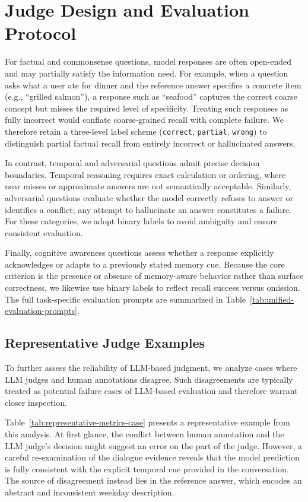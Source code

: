 \documentclass[11pt]{article}
\begin{document}
\section{Judge Design and Evaluation Protocol}
\label{app:judge_details}

For factual and commonsense questions, model responses are often
open-ended and may partially satisfy the information need.
For example, when a question asks what a user ate for dinner and the
reference answer specifies a concrete item (e.g., ``grilled salmon''),
a response such as ``seafood'' captures the correct coarse concept but
misses the required level of specificity.
Treating such responses as fully incorrect would conflate coarse-grained
recall with complete failure.
We therefore retain a three-level label scheme (\texttt{correct},
\texttt{partial}, \texttt{wrong}) to distinguish partial factual recall
from entirely incorrect or hallucinated answers.

In contrast, temporal and adversarial questions admit precise decision
boundaries.
Temporal reasoning requires exact calculation or ordering, where near
misses or approximate answers are not semantically acceptable.
Similarly, adversarial questions evaluate whether the model correctly
refuses to answer or identifies a conflict; any attempt to hallucinate an
answer constitutes a failure.
For these categories, we adopt binary labels to avoid ambiguity and
ensure consistent evaluation.

Finally, cognitive awareness questions assess whether a response
explicitly acknowledges or adapts to a previously stated memory cue.
Because the core criterion is the presence or absence of memory-aware
behavior rather than surface correctness, we likewise use binary labels
to reflect recall success versus omission.
The full task-specific evaluation prompts are summarized in Table~\ref{tab:unified-evaluation-prompts}.

\subsection{Representative Judge Examples}

To further assess the reliability of LLM-based judgment, we analyze cases
where LLM judges and human annotations disagree.
Such disagreements are typically treated as potential failure cases of
LLM-based evaluation and therefore warrant closer inspection.

Table~\ref{tab:representative-metrics-case} presents a representative
example from this analysis.
At first glance, the conflict between human annotation and the LLM
judge’s decision might suggest an error on the part of the judge.
However, a careful re-examination of the dialogue evidence reveals that
the model prediction is fully consistent with the explicit temporal cue
provided in the conversation.
The source of disagreement instead lies in the reference answer, which
encodes an abstract and inconsistent weekday description.
\end{document}

